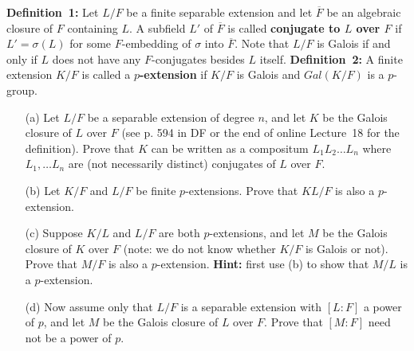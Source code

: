 \documentclass[12pt]{article}
\begin{document}
{\bf Definition~1:} Let $L/F$ be a finite separable extension
and let $\overline F$ be an algebraic closure of $F$ containing $L$.
A subfield $L'$ of $\overline F$ is called
{\bf conjugate to $L$ over $F$} if $L'=\sigma(L)$ for some $F$-embedding of
$\sigma$ into $\overline F$. Note that $L/F$ is Galois if and
only if $L$ does not have any $F$-conjugates besides $L$ itself.
\skv
{\bf Definition~2:} A finite extension $K/F$ is called
a {\bf $p$-extension} if $K/F$ is Galois and $Gal(K/F)$ is a $p$-group.
\skv
\begin{itemize}
\item[(a)] Let $L/F$ be a separable extension of degree $n$, and
let $K$ be the Galois closure of $L$ over $F$ (see p. 594 in DF or the end of online Lecture~18 for the definition). 
Prove that $K$ can be written as a compositum $L_1L_2\ldots L_n$
where $L_1,\ldots L_n$ are (not necessarily distinct) conjugates of
$L$ over $F$.

\item[(b)] Let $K/F$ and $L/F$ be finite $p$-extensions. Prove
that $KL/F$ is also a $p$-extension.

\item[(c)] Suppose $K/L$ and $L/F$ are both $p$-extensions, and
let $M$ be the Galois closure of $K$ over $F$ (note: we do
not know whether $K/F$ is Galois or not). Prove that
$M/F$ is also a $p$-extension. {\bf Hint:} first use (b) to show that
$M/L$ is a $p$-extension.

\item[(d)] Now assume only that $L/F$ is a separable extension
with $[L:F]$ a power of $p$, and let $M$ be the Galois closure
of $L$ over $F$. Prove that $[M:F]$ need not be a power of $p$.
\end{itemize}
\end{document}
